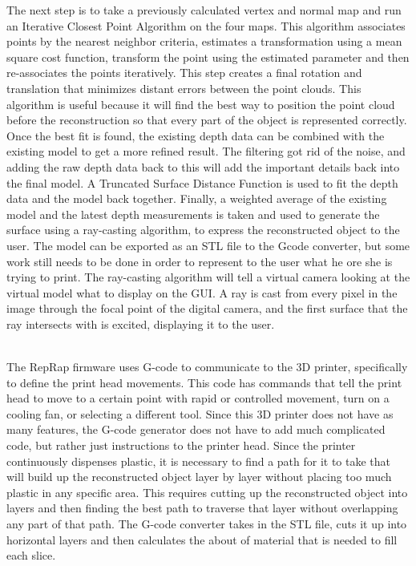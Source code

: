 \documentclass[12pt,twocolumn]{article}
\begin{document}
\indent The next step is to take a previously calculated vertex and normal map and run an Iterative Closest Point Algorithm on the four maps. This algorithm associates points by the nearest neighbor criteria, estimates a transformation using a mean square cost function, transform the point using the estimated parameter and then re-associates the points iteratively. This step creates a final rotation and translation that minimizes distant errors between the point clouds. This algorithm is useful because it will find the best way to position the point cloud before the reconstruction so that every part of the object is represented correctly. Once the best fit is found, the existing depth data can be combined with the existing model to get a more refined result. The filtering got rid of the noise, and adding the raw depth data back to this will add the important details back into the final model. A Truncated Surface Distance Function is used to fit the depth data and the model back together. Finally, a weighted average of the existing model and the latest depth measurements is taken and used to generate the surface using a ray-casting algorithm, to express the reconstructed object to the user. The model can be exported as an STL file to the Gcode converter, but some work still needs to be done in order to represent to the user what he ore she is trying to print. The ray-casting algorithm will tell a virtual camera looking at the virtual model what to display on the GUI. A ray is cast from every pixel in the image through the focal point of the digital camera, and the first surface that the ray intersects with is excited, displaying it to the user.  \cite{cite8}


\\ 
The RepRap firmware uses G-code to communicate to the 3D printer, specifically to define the print head movements. This code has commands that tell the print head to move to a certain point with rapid or controlled movement, turn on a cooling fan, or selecting a different tool. Since this 3D printer does not have as many features, the G-code generator does not have to add much complicated code, but rather just instructions to the printer head. Since the printer continuously dispenses plastic, it is necessary to find a path for it to take that will build up the reconstructed object layer by layer without placing too much plastic in any specific area. This requires cutting up the reconstructed object into layers and then finding the best path to traverse that layer without overlapping any part of that path. The G-code converter takes in the STL file, cuts it up into horizontal layers and then calculates the about of material that is needed to fill each slice. 
\end{document}
